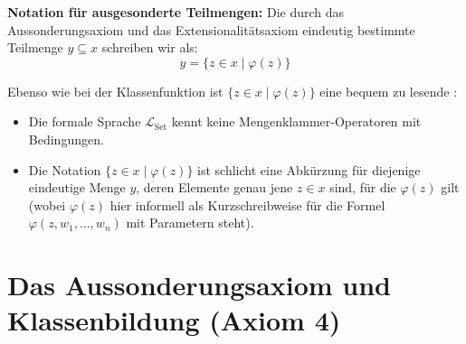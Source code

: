 \begin{math-stroke}
\begin{axioms}
\end{axioms}

\textbf{Notation für ausgesonderte Teilmengen:}
Die durch das Aussonderungsaxiom und das Extensionalitätsaxiom eindeutig bestimmte Teilmenge $y \subseteq x$ schreiben wir als:
\[
y = \{ z \in x \mid \varphi(z) \}
\]

\begin{explanation-of-steps}
Ebenso wie bei der Klassenfunktion ist $\{ z \in x \mid \varphi(z) \}$ eine bequem zu lesende :
\begin{itemize}
    \item Die formale Sprache $\mathcal{L}_{\text{Set}}$ kennt keine Mengenklammer-Operatoren mit Bedingungen.
    \item Die Notation $\{ z \in x \mid \varphi(z) \}$ ist schlicht eine Abkürzung für diejenige eindeutige Menge $y$, deren Elemente genau jene $z \in x$ sind, für die $\varphi(z)$ gilt (wobei $\varphi(z)$ hier informell als Kurzschreibweise für die Formel $\varphi(z, w_1, \dots, w_n)$ mit Parametern steht).
\end{itemize}
\end{explanation-of-steps}
\end{math-stroke}

\section{Das Aussonderungsaxiom und Klassenbildung (Axiom 4)}

